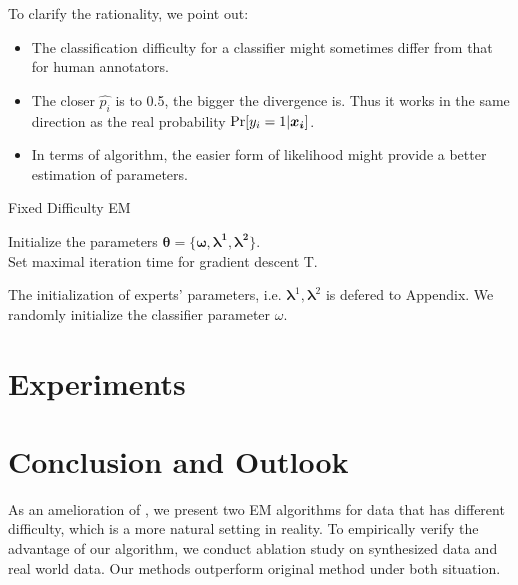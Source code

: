 \documentclass{article}
\begin{document}
To clarify the rationality, we point out:
\begin{itemize}
    \item The classification difficulty for a classifier might sometimes differ from that for human annotators.
    \item The closer $\hat{p_i}$ is to 0.5, the bigger the divergence is. Thus it works in the same direction as the real probability $\textup{Pr}[y_i=1|\bm{x_i}]$.
    \item In terms of algorithm, the easier form of likelihood might provide a better estimation of parameters.
\end{itemize} 

\begin{algorithm}
    \caption{Fixed Difficulty EM}
    Initialize the parameters $\bm{\theta}=\lbrace \bm{\omega,\lambda^1,\lambda^2}\}$.\\
    Set maximal iteration time for gradient descent T.\\
\end{algorithm}

The initialization of experts' parameters, i.e. $\bm{\lambda}^1,\bm{\lambda}^2$ is defered to Appendix. We randomly initialize the classifier parameter $\omega$.

\section{Experiments}


\section{Conclusion and Outlook}
As an amelioration of \cite{raykar2010learning}, we present two EM algorithms for data that has different difficulty, which is a more natural setting in reality. To empirically verify the advantage of our algorithm, we conduct ablation study on synthesized data and real world data. Our methods outperform original method under both situation.
\end{document}
